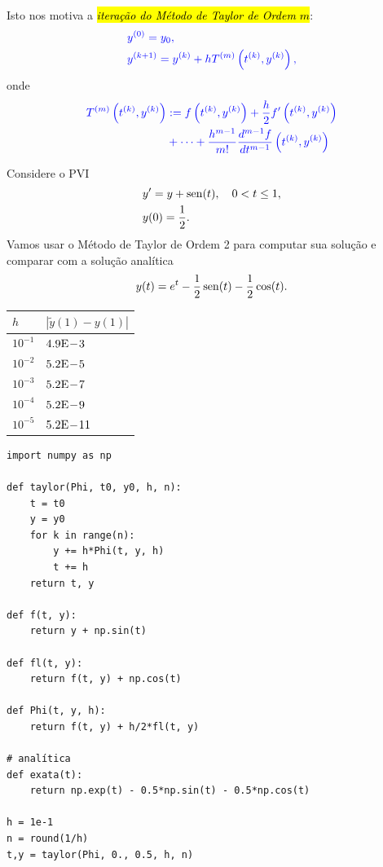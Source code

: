 Isto nos motiva a \hl{\emph{iteração do Método de Taylor de Ordem $m$}}:
\begin{subequations}\hleq
  \begin{align}
    &y^{(0)} = y_0,\\
    &y^{(k+1)} = y^{(k)} + hT^{(m)}\left(t^{(k)}, y^{(k)}\right),
  \end{align}  
\end{subequations}
onde
\begin{equation}\color{blue}\begin{aligned}
    T^{(m)}\left(t^{(k)}, y^{(k)}\right) &:= f\left(t^{(k)}, y^{(k)}\right) + \frac{h}{2}f'\left(t^{(k)}, y^{(k)}\right)\\
    &+ \cdots + \frac{h^{m-1}}{m!}\frac{d^{m-1} f}{d t^{m-1}}\left(t^{(k)}, y^{(k)}\right)
\end{aligned}
\end{equation}

\begin{ex}
  Considere o PVI
  \begin{subequations}
    \begin{align}
      &y' = y + \operatorname{sen}(t),\quad 0 < t \leq 1,\\
      &y(0) = \frac{1}{2}.
    \end{align}
  \end{subequations}
  Vamos usar o Método de Taylor de Ordem 2 para computar sua solução e comparar com a solução analítica
  \begin{equation}
    y(t) = e^t - \frac{1}{2}\operatorname{sen}(t) - \frac{1}{2}\cos(t).
  \end{equation}

  \begin{center}
    \begin{tabular}[H]{ll}
      $h$ & $\left|\tilde{y}(1) - y(1)\right|$\\\hline
      $10^{-1}$ & $4.9\mathrm{E}\!-\!3$ \\
      $10^{-2}$ & $5.2\mathrm{E}\!-\!5$ \\
      $10^{-3}$ & $5.2\mathrm{E}\!-\!7$ \\
      $10^{-4}$ & $5.2\mathrm{E}\!-\!9$ \\
      $10^{-5}$ & $5.2\mathrm{E}\!-\!11$ \\\hline
    \end{tabular}
  \end{center}

\begin{lstlisting}[caption=taylor.py, label=cap_pvi_sec_taylor:cod:taylor.py]
import numpy as np

def taylor(Phi, t0, y0, h, n):
    t = t0
    y = y0
    for k in range(n):
        y += h*Phi(t, y, h)
        t += h
    return t, y

def f(t, y):
    return y + np.sin(t)

def fl(t, y):
    return f(t, y) + np.cos(t)

def Phi(t, y, h):
    return f(t, y) + h/2*fl(t, y)

# analítica
def exata(t):
    return np.exp(t) - 0.5*np.sin(t) - 0.5*np.cos(t)

h = 1e-1
n = round(1/h)
t,y = taylor(Phi, 0., 0.5, h, n)
\end{lstlisting}
\end{ex}

